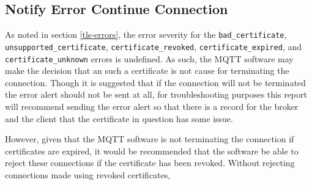 \documentclass[12pt]{article}
\begin{document}
\subsection{Notify Error Continue Connection}
As noted in section \ref{tls-errors}, the error severity for the \texttt{bad\_certificate}, \texttt{unsupported\_certificate}, \texttt{certificate\_revoked}, \texttt{certificate\_expired}, and \texttt{certificate\_unknown} errors is undefined. As such, the MQTT software may make the decision that an such a certificate is not cause for terminating the connection. Though it is suggested that if the connection will not be terminated the error alert should not be sent at all, for troubleshooting purposes this report will recommend sending the error alert so that there is a record for the broker and the client that the certificate in question has some issue.\par
However, given that the MQTT software is not terminating the connection if certificates are expired, it would be recommended that the software be able to reject these connections if the certificate has been revoked. Without rejecting connections made using revoked certificates, 
\end{document}
